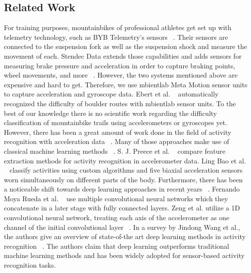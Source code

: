 \documentclass[runningheads]{llncs}
\begin{document}
\subsection{Related Work}
For training purposes, mountainbikes of professional athletes get set up with telemetry technology, such as BYB Telemetry's sensors ~\cite{bybtelemetry}.
Their sensors are connected to the suspension fork as well as the suspension shock and measure the movement of each.
Stendec Data extends those capabilities and adds sensors for measuring brake pressure and acceleration in order to capture braking points, wheel movements, and more ~\cite{stendecracing}.
However, the two systems mentioned above are expensive and hard to get.
Therefore, we use mbientlab Meta Motion sensor units to capture acceleration and gyroscope data.
Ebert et al. ~\cite{ebert2017automated} automatically recognized the difficulty of boulder routes with mbientlab sensor units.
To the best of our knowledge there is no scientific work regarding the difficulty classification of mountainbike trails using accelerometers or gyroscopes yet.
However, there has been a great amount of work done in the field of activity recognition with acceleration data ~\cite{ravi2005activity,bao2004activity,kwapisz2011activity,lara2012survey,yang2015deep,zeng2014convolutional,ronao2016human}.
Many of those approaches make use of classical machine learning methods ~\cite{ravi2005activity,bao2004activity,kwapisz2011activity,lara2012survey,preece2008comparison}.
S. J. Preece et al. ~\cite{preece2008comparison} compare feature extraction methods for activity recognition in accelerometer data.
Ling Bao et al. ~\cite{bao2004activity} classify activities using custom algorithms and five  biaxial acceleration sensors worn simultaneously on different parts of the body.
Furthermore, there has been a noticeable shift towards deep learning approaches in recent years ~\cite{yang2015deep,zeng2014convolutional,ronao2016human}.
Fernando Moya Rueda et al. ~\cite{moya2018convolutional} use multiple convolutional neural networks which they concatenate in a later stage with fully connected layers.
Zeng et al. utilize a 1D convolutional neural network, treating each axis of the accelerometer as one channel of the initial convolutional layer ~\cite{zeng2014convolutional}.
In a survey by Jindong Wang et al., the authors give an overview of state-of-the art deep learning methods in activity recognition ~\cite{wang2019deep}.
The authors claim that deep learning outperforms traditional machine learning methods and has been widely adopted for sensor-based activity recognition tasks.
\end{document}
